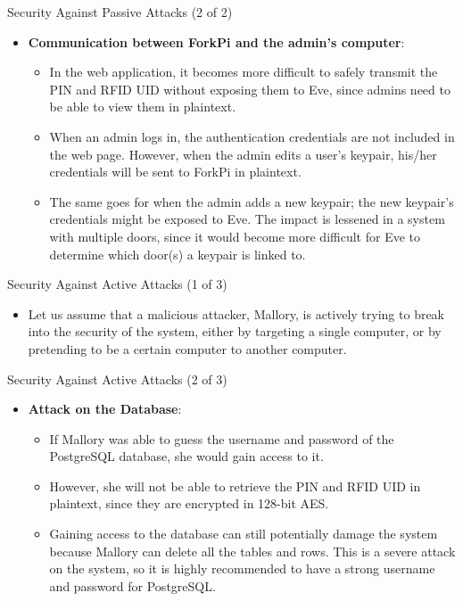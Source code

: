 \begin{frame}{Security Against Passive Attacks (2 of 2)}
\begin{itemize}
    \item<1-> \textbf{Communication between ForkPi and the admin’s computer}:
    \begin{itemize}
    	\item<2-> In the web application, it becomes more difficult to safely transmit the PIN and RFID UID without exposing them to Eve, since admins need to be able to view them in plaintext.
    	\item<3-> When an admin logs in, the authentication credentials are not included in the web page. However, when the admin edits a user’s keypair, his/her credentials will be sent to ForkPi in plaintext.
    	\item<4-> The same goes for when the admin adds a new keypair; the new keypair’s credentials might be exposed to Eve. The impact is lessened in a system with multiple doors, since it would become more difficult for Eve to determine which door(s) a keypair is linked to.
    \end{itemize}
\end{itemize}
\end{frame}

\begin{frame}{Security Against Active Attacks (1 of 3)}
\begin{itemize}
    \item<1-> Let us assume that a malicious attacker, Mallory, is actively trying to break into the security of the system, either by targeting a single computer, or by pretending to be a certain computer to another computer.
\end{itemize}
\end{frame}

\begin{frame}{Security Against Active Attacks (2 of 3)}
\begin{itemize}
    \item<1-> \textbf{Attack on the Database}:
    \begin{itemize}
    	\item<2-> If Mallory was able to guess the username and password of the PostgreSQL database, she would gain access to it.
    	\item<3-> However, she will not be able to retrieve the PIN and RFID UID in plaintext, since they are encrypted in 128-bit AES.
    	\item<4-> Gaining access to the database can still potentially damage the system because Mallory can delete all the tables and rows. This is a severe attack on the system, so it is highly recommended to have a strong username and password for PostgreSQL.
    \end{itemize}
\end{itemize}
\end{frame}

